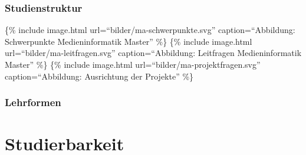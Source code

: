 \subsection{Studienstruktur}\label{studienstruktur}

\{\% include image.html url=``bilder/ma-schwerpunkte.svg''
caption=``Abbildung: Schwerpunkte Medieninformatik Master'' \%\} \{\%
include image.html url=``bilder/ma-leitfragen.svg'' caption=``Abbildung:
Leitfragen Medieninformatik Master'' \%\} \{\% include image.html
url=``bilder/ma-projektfragen.svg'' caption=``Abbildung: Ausrichtung der
Projekte'' \%\}

\subsection{Lehrformen}\label{lehrformen-1}

\chapter{Studierbarkeit}\label{studierbarkeit}

